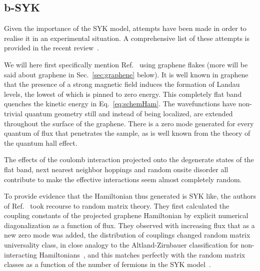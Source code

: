 \subsection{b-SYK}
Given the importance of the SYK model, attempts have been made in order to realise it in an experimental situation. A comprehensive list of these attempts is provided in the recent review~\cite{chowdhury_sachdev-ye-kitaev_2021}. 

\par 
We will here first specifically mention Ref.~\cite{Chen2018} using graphene flakes (more will be said about graphene in Sec.~\ref{sec:graphene} below). It is well known in graphene that the presence of a strong magnetic field induces the formation of Landau levels, the lowest of which is pinned to zero energy. This completely flat band quenches the kinetic energy in Eq.~\ref{eq:schemHam}. The wavefunctions have non-trivial quantum geometry still and instead of being localized, are extended throughout the surface of the graphene. There is a zero mode generated for every quantum of flux that penetrates the sample, as is well known from the theory of the quantum hall effect. 

\par
The effects of the coulomb interaction projected onto the degenerate states of the flat band, next nearest neighbor hoppings and random onsite disorder all contribute to make the effective interactions seem almost completely random. 

\par
To provide evidence that the Hamiltonian thus generated is SYK like, the authors of  Ref.~\cite{Chen2018} took recourse to random matrix theory. They first calculated the coupling constants of the projected graphene Hamiltonian by explicit numerical diagonalization as a function of flux. They observed with increasing flux that as a new zero mode was added, the distribution of couplings changed random matrix universality class, in close analogy to the Altland-Zirnbauer classification for non-interacting Hamiltonians~\cite{altland1997nonstandard,fidkowski2010effects,fidkowski2011topological}, and this matches perfectly with the random matrix classes as a function of the number of fermions in the SYK model~\cite{garcia2016spectral,behrends2019tenfold,you2017sachdev}. 

